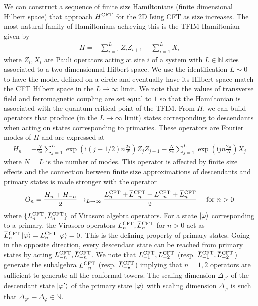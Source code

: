\documentclass[10pt, a4paper]{article}
\begin{document}
{\begin{enumerate}
  We can construct a sequence of finite size Hamiltonians (finite dimensional Hilbert space) that approach $H^{\rm CFT}$ for the 2D Ising CFT as size increases. The most natural family of Hamiltonians achieving this is the TFIM Hamiltonian given by 
  \begin{align*}
    H=-\sum_{i=1}^L Z_i Z_{i+1}-\sum_{i=1}^L X_i
  \end{align*}
  where $Z_i, X_i$ are Pauli operators acting at site $i$ of a system with $L \in \mathbb{N}$ sites associated to a two-dimensionnal Hilbert space. We use the identification $L \sim 0$ to have the model defined on a circle and eventually have its Hilbert space match the CFT Hilbert space in the $L \to \infty$ limit. We note that the values of transverse field and ferromagnetic coupling are set equal to $1$ so that the Hamiltonian is associated with the quantum critical point of the TFIM. From $H$, we can build operators that produce (in the $L \to \infty$ limit) states corresponding to descendants when acting on states corresponding to primaries. These operators are Fourier modes of $H$ and are expressed at 
  \begin{align*}
    H_n = -\frac{N}{2 \pi} \sum_{j=1}^L \exp \left(\mathrm{i}(j+1 / 2) n \frac{2 \pi}{N}\right) Z_j Z_{j+1}-\frac{N}{2 \pi} \sum_{j=1}^L \exp \left(\mathrm{i} j n \frac{2 \pi}{N}\right) X_j
  \end{align*}
  where $N = L$ is the number of modes. This operator is affected by finite size effects and the connection between finite size approximations of descendants and primary states is made stronger with the operator 
  \begin{align*}
    O_n=\frac{H_n+H_{-n}}{2} \to_{L\to \infty} \frac{L_n^{\rm C F T}+\bar{L}_{-n}^{\rm C F T}+L_{-n}^{\rm C F T}+\bar{L}_n^{\rm C F T}}{2} \quad \text { for } n>0
  \end{align*}
  where $\{L_n^{\rm CFT}, \bar{L}_{n}^{\rm CFT}\}$ of Virasoro algebra operators. For a state $\ket{\varphi}$ corresponding to a primary, the Virasoro operators $L_{n}^{\rm CFT}, \bar{L}_{n}^{\rm CFT}$ for $n > 0$ act as $\bar{L}_{n}^{\rm CFT} \ket{\varphi} = L_{n}^{\rm CFT} \ket{\varphi} = 0$. This is the defining property of primary states. Going in the opposite direction, every descendant state can be reached from primary states by acting $L_{-n}^{\rm CFT}, \bar{L}_{-n}^{\rm CFT}$. We note that $L_{-1}^{\rm CFT}, L_{-2}^{\rm CFT}$ (resp. $\bar{L}_{-1}^{\rm CFT}, \bar{L}_{-2}^{\rm CFT}$) generate the subalgebra $L_{-n}^{\rm CFT}$ (resp. $\bar{L}_{-n}^{\rm CFT}$) implying that $n=1, 2$ operators are sufficient to generate all the conformal towers. The scaling dimension $\Delta_{\varphi'}$ of the descendant state $\ket{\varphi'}$ of the primary state $\ket{\varphi}$ with scaling dimension $\Delta_\varphi$ is such that $\Delta_{\varphi'} - \Delta_\varphi \in \mathbb{N}$. \\
  

\end{enumerate}}
\end{document}
